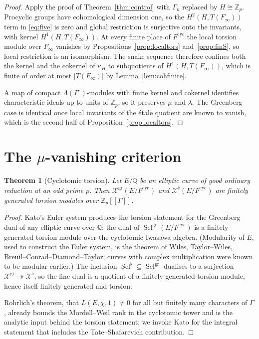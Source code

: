 \documentclass[11pt]{article}
\newtheorem{theorem}{Theorem}[section]
\theoremstyle{definition}
\theoremstyle{remark}
\newcommand{\Z}{\mathbb{Z}}
\newcommand{\Q}{\mathbb{Q}}
\newcommand{\Sel}{\operatorname{Sel}}
\newcommand{\cyc}{\mathrm{cyc}}
\newcommand{\gr}{\mathrm{gr}}
\newcommand{\flatp}{\flat}
\newcommand{\cX}{\mathcal{X}}
\newcommand{\Lam}{\Lambda}
\newcommand{\Gam}{\Gamma^{\circ}}
\begin{document}
\begin{proof}
Apply the proof of Theorem~\ref{thm:control} with \(\Gamma_n\) replaced by \(H\cong\Z_p\). Procyclic groups have cohomological dimension one, so the \(H^2(H,T(F_\infty))\) term in \eqref{eq:five} is zero and global restriction is surjective onto the invariants, with kernel \(H^1(H,T(F_\infty))\). At every finite place of \(F^{\cyc}\) the local torsion module over \(F_\infty\) vanishes by Propositions~\ref{prop:localtors} and~\ref{prop:finS}, so local restriction is an isomorphism. The snake sequence therefore confines both the kernel and the cokernel of \(\kappa_H\) to subquotients of \(H^1(H,T(F_\infty))\), which is finite of order at most \(|T(F_\infty)|\) by Lemma~\ref{lem:cohfinite}.

A map of compact \(\Lam(\Gam)\)-modules with finite kernel and cokernel identifies characteristic ideals up to units of \(\Z_p\), so it preserves \(\mu\) and \(\lambda\). The Greenberg case is identical once local invariants of the \'etale quotient are known to vanish, which is the second half of Proposition~\ref{prop:localtors}.
\end{proof}

\section{The \(\mu\)-vanishing criterion}
\label{sec:mu}

\begin{theorem}[Cyclotomic torsion]
\label{thm:kato}
Let \(E/\Q\) be an elliptic curve of good ordinary reduction at an odd prime \(p\). Then \(\cX^{\gr}(E/F^{\cyc})\) and \(\cX^{\flatp}(E/F^{\cyc})\) are finitely generated torsion modules over \(\Z_p[[\Gamma]]\).
\end{theorem}

\begin{proof}
Kato's Euler system produces the torsion statement for the Greenberg dual of any elliptic curve over \(\Q\): the dual of \(\Sel^{\gr}(E/F^{\cyc})\) is a finitely generated torsion module over the cyclotomic Iwasawa algebra. (Modularity of \(E\), used to construct the Euler system, is the theorem of Wiles, Taylor--Wiles, Breuil--Conrad--Diamond--Taylor; curves with complex multiplication were known to be modular earlier.) The inclusion \(\Sel^{\flatp}\subseteq\Sel^{\gr}\) dualises to a surjection \(\cX^{\gr}\twoheadrightarrow\cX^{\flatp}\), so the fine dual is a quotient of a finitely generated torsion module, hence itself finitely generated and torsion.

Rohrlich's theorem, that \(L(E,\chi,1)\neq 0\) for all but finitely many characters of \(\Gamma\), already bounds the Mordell--Weil rank in the cyclotomic tower and is the analytic input behind the torsion statement; we invoke Kato for the integral statement that includes the Tate--Shafarevich contribution.
\end{proof}
\end{document}

